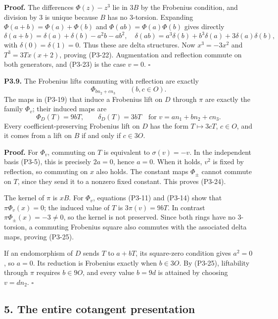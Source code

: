 \documentclass[
]{article}
\begin{document}
\textbf{Proof.} The differences \(\Phi(z)-z^3\) lie in \(3B\) by the
Frobenius condition, and division by 3 is unique because \(B\) has no
3-torsion. Expanding \(\Phi(a+b)=\Phi(a)+\Phi(b)\) and
\(\Phi(ab)=\Phi(a)\Phi(b)\) gives directly \[
\delta(a+b)=\delta(a)+\delta(b)-a^2b-ab^2,
\quad
\delta(ab)=a^3\delta(b)+b^3\delta(a)+3\delta(a)\delta(b),
\] with \(\delta(0)=\delta(1)=0\). Thus these are delta structures. Now
\(x^3=-3x^2\) and \(T^3=3Tx(x+2)\), proving (P3-22). Augmentation and
reflection commute on both generators, and (P3-23) is the case \(v=0\).
\(\square\)

\textbf{P3.9.} The Frobenius lifts commuting with reflection are exactly
\[
\Phi_{bn_2+cn_3}\qquad(b,c\in O).
\tag{P3-24}
\] The maps in (P3-19) that induce a Frobenius lift on \(D\) through
\(\pi\) are exactly the family \(\Phi_v\); their induced maps are \[
\Phi_D(T)=9bT,\qquad\delta_D(T)=3bT
\quad\text{for }v=an_1+bn_2+cn_3.
\tag{P3-25}
\] Every coefficient-preserving Frobenius lift on \(D\) has the form
\(T\mapsto3cT\), \(c\in O\), and it comes from a lift on \(B\) if and
only if \(c\in3O\).

\textbf{Proof.} For \(\Phi_v\), commuting on \(T\) is equivalent to
\(\sigma(v)=-v\). In the independent basis (P3-5), this is precisely
\(2a=0\), hence \(a=0\). When it holds, \(v^2\) is fixed by reflection,
so commuting on \(x\) also holds. The constant maps \(\Phi_\pm\) cannot
commute on \(T\), since they send it to a nonzero fixed constant. This
proves (P3-24).

The kernel of \(\pi\) is \(xB\). For \(\Phi_v\), equations (P3-11) and
(P3-14) show that \(\pi\Phi_v(x)=0\); the induced value of \(T\) is
\(3\pi(v)=9bT\). In contrast \(\pi\Phi_\pm(x)=-3\ne0\), so the kernel is
not preserved. Since both rings have no 3-torsion, a commuting Frobenius
square also commutes with the associated delta maps, proving (P3-25).

If an endomorphism of \(D\) sends \(T\) to \(a+bT\), its square-zero
condition gives \(a^2=0\), so \(a=0\). Its reduction is Frobenius
exactly when \(b\in3O\). By (P3-25), liftability through \(\pi\)
requires \(b\in9O\), and every value \(b=9d\) is attained by choosing
\(v=dn_2\). \(\square\)

\subsection{5. The entire cotangent
presentation}\label{the-entire-cotangent-presentation}
\end{document}
